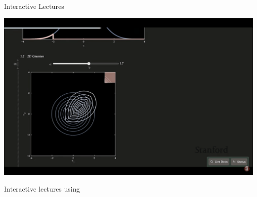 \begin{frame}[fragile]{Interactive Lectures}

\centering
\includegraphics[width=0.7\linewidth]{media/aa228v-pluto-example.png}

{\footnotesize Interactive lectures using }

\end{frame}